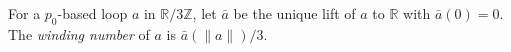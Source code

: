For a $p_0$-based loop $a$ in $\mathbb{R}/3\mathbb{Z}$, let $\bar{a}$ be the unique lift of $a$ to $\mathbb{R}$ with $\bar{a}(0) = 0$. The \textit{winding number} of $a$ is $\bar{a}(\|a\|) / 3$.
